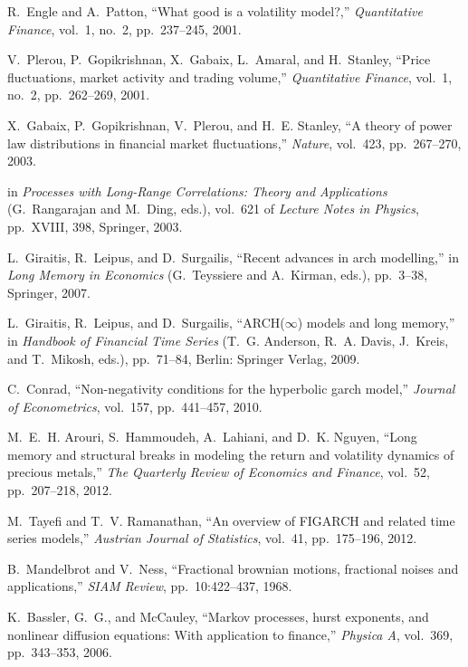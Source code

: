 \documentclass{article}
\begin{document}
\begin{thebibliography}{10}

R.~Engle and A.~Patton, ``What good is a volatility model?,'' {\em Quantitative
  Finance}, vol.~1, no.~2, pp.~237--245, 2001.

V.~Plerou, P.~Gopikrishnan, X.~Gabaix, L.~Amaral, and H.~Stanley, ``Price
  fluctuations, market activity and trading volume,'' {\em Quantitative
  Finance}, vol.~1, no.~2, pp.~262--269, 2001.

X.~Gabaix, P.~Gopikrishnan, V.~Plerou, and H.~E. Stanley, ``A theory of power
  law distributions in financial market fluctuations,'' {\em Nature}, vol.~423,
  pp.~267--270, 2003.

 in {\em Processes with Long-Range Correlations: Theory and Applications}
  (G.~Rangarajan and M.~Ding, eds.), vol.~621 of {\em Lecture Notes in
  Physics}, pp.~XVIII, 398, Springer, 2003.

L.~Giraitis, R.~Leipus, and D.~Surgailis, ``Recent advances in arch
  modelling,'' in {\em Long Memory in Economics} (G.~Teyssiere and A.~Kirman,
  eds.), pp.~3--38, Springer, 2007.

L.~Giraitis, R.~Leipus, and D.~Surgailis, ``{ARCH}($\infty$) models and long
  memory,'' in {\em Handbook of Financial Time Series} (T.~G. Anderson, R.~A.
  Davis, J.~Kreis, and T.~Mikosh, eds.), pp.~71--84, Berlin: Springer Verlag,
  2009.

C.~Conrad, ``Non-negativity conditions for the hyperbolic garch model,'' {\em
  Journal of Econometrics}, vol.~157, pp.~441--457, 2010.

M.~E.~H. Arouri, S.~Hammoudeh, A.~Lahiani, and D.~K. Nguyen, ``Long memory and
  structural breaks in modeling the return and volatility dynamics of precious
  metals,'' {\em The Quarterly Review of Economics and Finance}, vol.~52,
  pp.~207--218, 2012.

M.~Tayefi and T.~V. Ramanathan, ``An overview of {FIGARCH} and related time
  series models,'' {\em Austrian Journal of Statistics}, vol.~41, pp.~175--196,
  2012.

B.~Mandelbrot and V.~Ness, ``Fractional brownian motions, fractional noises and
  applications,'' {\em SIAM Review}, pp.~10:422--437, 1968.

K.~Bassler, G.~G., and McCauley, ``Markov processes, hurst exponents, and
  nonlinear diffusion equations: With application to finance,'' {\em Physica
  A}, vol.~369, pp.~343--353, 2006.


\end{thebibliography}
\end{document}
